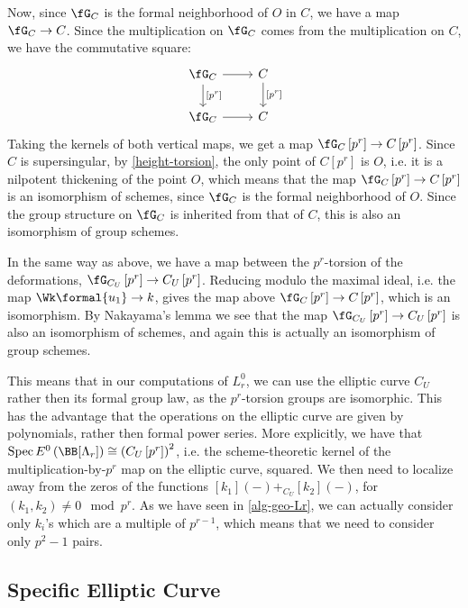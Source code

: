 Now, since $\fG_C$ is the formal neighborhood of $O$ in $C$, we have a map $\fG_C \to C$.
Since the multiplication on $\fG_C$ comes from the multiplication on $C$, we have the commutative square:
$$
\begin{tikzcd}
	\fG_C \arrow{r}{} \arrow{d}{\left[p^r\right]} & C \arrow{d}{\left[p^r\right]} \\
	\fG_C \arrow{r}{} & C
\end{tikzcd}
$$
Taking the kernels of both vertical maps, we get a map $\fG_C\left[p^r\right] \to C\left[p^r\right]$.
Since $C$ is supersingular, by \ref{height-torsion}, the only point of $C\left[p^r\right]$ is $O$, i.e. it is a nilpotent thickening of the point $O$, which means that the map $\fG_C\left[p^r\right] \to C\left[p^r\right]$ is an isomorphism of schemes, since $\fG_C$ is the formal neighborhood of $O$.
Since the group structure on $\fG_C$ is inherited from that of $C$, this is also an isomorphism of group schemes.

In the same way as above, we have a map between the $p^r$-torsion of the deformations, $\fG_{C_U}\left[p^r\right] \to C_U\left[p^r\right]$.
Reducing modulo the maximal ideal, i.e. the map $\Wk\formal{u_1} \to k$, gives the map above $\fG_C\left[p^r\right] \to C\left[p^r\right]$, which is an isomorphism.
By Nakayama's lemma we see that the map $\fG_{C_U}\left[p^r\right] \to C_U\left[p^r\right]$ is also an isomorphism of schemes, and again this is actually an isomorphism of group schemes.

This means that in our computations of $L_r^0$, we can use the elliptic curve $C_U$ rather then its formal group law, as the $p^r$-torsion groups are isomorphic.
This has the advantage that the operations on the elliptic curve are given by polynomials, rather then formal power series.
More explicitly, we have that $\spec E^0\left(\BB[\Lambda_r]\right) \cong \left(C_U\left[p^r\right]\right)^2$, i.e. the scheme-theoretic kernel of the multiplication-by-$p^r$ map on the elliptic curve, squared.
We then need to localize away from the zeros of the functions $[k_1]\left(-\right) +_{C_U} [k_2]\left(-\right)$, for $\left(k_1, k_2\right) \neq 0 \mod p^r$.
As we have seen in \ref{alg-geo-Lr}, we can actually consider only $k_i$'s which are a multiple of $p^{r-1}$, which means that we need to consider only $p^2-1$ pairs.



\subsection{Specific Elliptic Curve}

